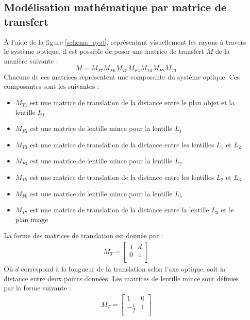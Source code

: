 \documentclass[11pt,letterpaper]{article}
\begin{document}
\subsection{Modélisation mathématique par matrice de transfert}
À l'aide de la figure \ref{schema_syst}, représentant visuellement les rayons à travers le système optique, il est possible de poser une matrice de transfert $M$ de la manière suivante :
\begin{equation}
  M=M_{T7}M_{F6}M_{T5}M_{F4}M_{T3}M_{F2}M_{T1}
\end{equation}
Chacune de ces matrices représentent une composante du système optique. Ces composantes sont les suivantes :
\begin{itemize}
  \item $M_{T1}$ est une matrice de translation de la distance entre le plan objet et la lentille $L_1$
  \item $M_{F2}$ est une matrice de lentille mince pour la lentille $L_1$
  \item $M_{T3}$ est une matrice de translation de la distance entre les lentilles $L_1$ et $L_2$
  \item $M_{F4}$ est une matrice de lentille mince pour la lentille $L_2$
  \item $M_{T5}$ est une matrice de translation de la distance entre les lentilles $L_2$ et $L_3$
  \item $M_{F6}$ est une matrice de lentille mince pour la lentille $L_3$
  \item $M_{T7}$ est une matrice de translation de la distance entre la lentille $L_3$ et le plan image
\end{itemize}
La forme des matrices de translation est donnée par :
\begin{gather}
  M_T=
  \begin{bmatrix}
    1 & d \\
    0 & 1 \\
  \end{bmatrix}
\end{gather}
Où $d$ correspond à la longueur de la translation selon l'axe optique, soit la distance entre deux points données. Les matrices de lentille mince sont définies par la forme suivante :
\begin{gather}
  M_T=
  \begin{bmatrix}
    1 & 0 \\
    -\frac{1}{f} & 1 \\
  \end{bmatrix}
\end{gather}
\end{document}
